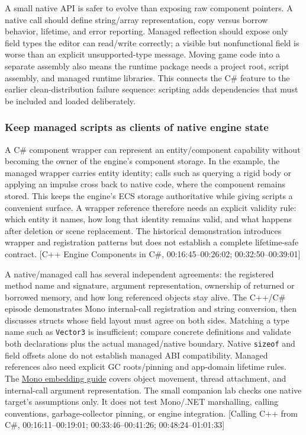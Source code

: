 A small native API is safer to evolve than exposing raw component pointers. A native call should define string/array representation, copy versus borrow behavior, lifetime, and error reporting. Managed reflection should expose only field types the editor can read/write correctly; a visible but nonfunctional field is worse than an explicit unsupported-type message. Moving game code into a separate assembly also means the runtime package needs a project root, script assembly, and managed runtime libraries. This connects the C\# feature to the earlier clean-distribution failure sequence: scripting adds dependencies that must be included and loaded deliberately.

\subsubsection{Keep managed scripts as clients of native engine state}\label{06-engine-ii-ch040-keep-managed-scripts-as-clients-of-native-engine-state}

\hypertarget{06-engine-ii-ch040-keep-managed-scripts-as-clients-of-native-engine-state}{}

A C\# component wrapper can represent an entity/component capability without becoming the owner of the engine's component storage. In the example, the managed wrapper carries entity identity; calls such as querying a rigid body or applying an impulse cross back to native code, where the component remains stored. This keeps the engine's ECS storage authoritative while giving scripts a convenient surface. A wrapper reference therefore needs an explicit validity rule: which entity it names, how long that identity remains valid, and what happens after deletion or scene replacement. The historical demonstration introduces wrapper and registration patterns but does not establish a complete lifetime-safe contract. {[}C++ Engine Components in C\#, 00:16:45--00:26:02; 00:32:50--00:39:01{]}

A native/managed call has several independent agreements: the registered method name and signature, argument representation, ownership of returned or borrowed memory, and how long referenced objects stay alive. The C++/C\# episode demonstrates Mono internal-call registration and string conversion, then discusses structs whose field layout must agree on both sides. Matching a type name such as \texttt{Vector3} is insufficient; compare concrete definitions and validate both declarations plus the actual managed/native boundary. Native \texttt{sizeof} and field offsets alone do not establish managed ABI compatibility. Managed references also need explicit GC roots/pinning and app-domain lifetime rules. The \href{https://www.mono-project.com/docs/advanced/embedding/}{Mono embedding guide} covers object movement, thread attachment, and internal-call argument representation. The small companion lab checks one native target's assumptions only. It does not test Mono/.NET marshalling, calling conventions, garbage-collector pinning, or engine integration. {[}Calling C++ from C\#, 00:16:11--00:19:01; 00:33:46--00:41:26; 00:48:24--01:01:33{]}

